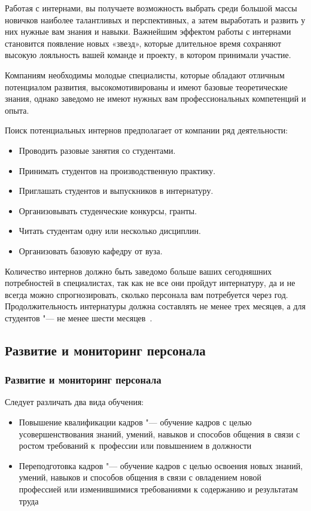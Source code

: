 \documentclass{../industrial-development}
\begin{document}
Работая с интернами, вы получаете возможность выбрать среди большой массы новичков наиболее талантливых и перспективных, а затем выработать и развить у них нужные вам знания и навыки. Важнейшим эффектом работы с интернами становится появление новых «звезд», которые длительное время сохраняют высокую лояльность вашей команде и проекту, в котором принимали участие.

Компаниям необходимы молодые специалисты, которые обладают отличным потенциалом развития, высокомотивированы и имеют базовые теоретические знания, однако заведомо не имеют нужных вам профессиональных компетенций и опыта.

Поиск потенциальных интернов предполагает от компании ряд деятельности:
  \begin{itemize}
\item	Проводить разовые занятия со студентами.
\item	Принимать студентов на производственную практику.
\item	Приглашать студентов и выпускников в интернатуру.
\item	Организовывать студенческие конкурсы, гранты.
\item	Читать студентам одну или несколько дисциплин.
\item Организовать базовую кафедру от вуза.
  \end{itemize}
Количество интернов должно быть заведомо больше ваших сегодняшних потребностей в специалистах, так как не все они пройдут интернатуру, да и не всегда можно спрогнозировать, сколько персонала вам потребуется через год. Продолжительность интернатуры должна составлять не менее трех месяцев, а для студентов "--- не менее шести месяцев~\cite[с.~277--279]{Pererva}.


\subsection{Развитие и мониторинг персонала}

\begin{frame} \frametitle{Развитие и мониторинг персонала}
  Следует различать два вида обучения:
	\begin{itemize}
		\item \alert{Повышение квалификации кадров} "--- обучение кадров с целью усовершенствования знаний, умений, навыков и способов общения в связи с ростом требований к~профессии или повышением в должности 
	
		\item \alert{Переподготовка кадров} "--- обучение кадров с целью освоения новых знаний, умений, навыков и способов общения в связи с овладением новой профессией или изменившимися требованиями к содержанию и результатам труда
		  
  \end{itemize}
\end{frame}
\end{document}
